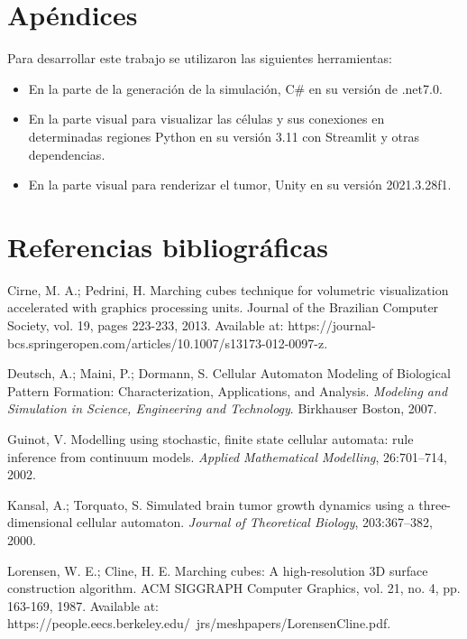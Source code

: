 \documentclass[a4paper,11pt]{article}
\begin{document}
{\section*{Ap\'endices}

Para desarrollar este trabajo se utilizaron las siguientes herramientas:
\begin{itemize}
    \item En la parte de la generaci\'on de la simulaci\'on, C\# en su versi\'on de .net7.0.
    \item En la parte visual para visualizar las c\'elulas y sus conexiones en determinadas regiones Python en su versi\'on 3.11 con Streamlit y otras dependencias.
    \item En la parte visual para renderizar el tumor, Unity en su versi\'on 2021.3.28f1.
\end{itemize}



\section*{Referencias bibliográficas}
\label{Nada}
\begin{flushleft}

\begin{thebibliography}{99}

 Cirne, M. A.; Pedrini, H. Marching cubes technique for volumetric visualization accelerated with graphics processing units. Journal of the Brazilian Computer Society, vol. 19, pages 223-233, 2013. Available at: https://journal-bcs.springeropen.com/articles/10.1007/s13173-012-0097-z.

\vskip 0.2cm
 Deutsch, A.; Maini, P.; Dormann, S. Cellular Automaton Modeling of Biological Pattern Formation: Characterization, Applications, and Analysis. \textit{Modeling and Simulation in Science, Engineering and Technology}. Birkhauser Boston, 2007.

\vskip 0.2cm
 Guinot, V. Modelling using stochastic, finite state cellular automata: rule inference from continuum models. \textit{Applied Mathematical Modelling}, 26:701–714, 2002.


\vskip 0.2cm
 Kansal, A.; Torquato, S. Simulated brain tumor growth dynamics using a three-dimensional cellular automaton. \textit{Journal of Theoretical Biology}, 203:367–382, 2000.

\vskip 0.2cm
 Lorensen, W. E.; Cline, H. E. Marching cubes: A high-resolution 3D surface construction algorithm. ACM SIGGRAPH Computer Graphics, vol. 21, no. 4, pp. 163-169, 1987. Available at: https://people.eecs.berkeley.edu/~jrs/meshpapers/LorensenCline.pdf.\\


\end{thebibliography}
\end{flushleft}}
\end{document}
